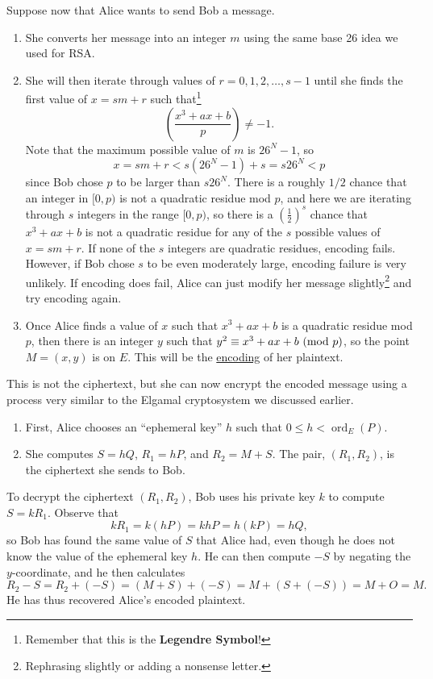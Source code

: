 \documentclass[letterpaper]{article}
\DeclareMathOperator{\ord}{ord}
\begin{document}
Suppose now that Alice wants to send Bob a message.
\begin{enumerate}
    \item She converts her message into an integer $m$ using the same base 26 idea we used for RSA. 
    \item She will then iterate through values of $r = 0, 1, 2, \hdots, s - 1$ until she finds the first value of $x = sm + r$ such that\footnote{Remember that this is the \textbf{Legendre Symbol}!}
    \[\left(\frac{x^3 + ax + b}{p}\right) \neq -1.\]
    Note that the maximum possible value of $m$ is $26^N - 1$, so 
    \[x = sm + r < s(26^N - 1) + s = s26^N < p\]
    since Bob chose $p$ to be larger than $s26^N$. There is a roughly $1/2$ chance that an integer in $[0, p)$ is not a quadratic residue mod $p$, and here we are iterating through $s$ integers in the range $[0, p)$, so there is a $\left(\frac{1}{2}\right)^s$ chance that $x^3 + ax + b$ is not a quadratic residue for any of the $s$ possible values of $x = sm + r$. If none of the $s$ integers are quadratic residues, encoding fails. However, if Bob chose $s$ to be even moderately large, encoding failure is very unlikely. If encoding does fail, Alice can just modify her message slightly\footnote{Rephrasing slightly or adding a nonsense letter.} and try encoding again. 
    
    \item Once Alice finds a value of $x$ such that $x^3 + ax + b$ is a quadratic residue mod $p$, then there is an integer $y$ such that $y^2 \equiv x^3 + ax + b \ (\mathrm{mod}\ p)$, so the point $M = (x, y)$ is on $E$. This will be the \underline{encoding} of her plaintext.
\end{enumerate}
This is not the ciphertext, but she can now encrypt the encoded message using a process very similar to the Elgamal cryptosystem we discussed earlier. 
\begin{enumerate}
    \item First, Alice chooses an ``ephemeral key'' $h$ such that $0 \leq h < \ord_{E}(P)$.
    \item She computes $S = hQ$, $R_1 = hP$, and $R_2 = M + S$. The pair, $(R_1, R_2)$, is the ciphertext she sends to Bob. 
\end{enumerate}
To decrypt the ciphertext $(R_1, R_2)$, Bob uses his private key $k$ to compute $S = kR_1$. Observe that 
\[kR_1 = k(hP) = khP = h(kP) = hQ,\]
so Bob has found the same value of $S$ that Alice had, even though he does not know the value of the ephemeral key $h$. He can then compute $-S$ by negating the $y$-coordinate, and he then calculates 
\[R_2 - S = R_2 + (-S) = (M + S) + (-S) = M + (S + (-S)) = M + O = M.\]
He has thus recovered Alice's encoded plaintext. 
\end{document}
